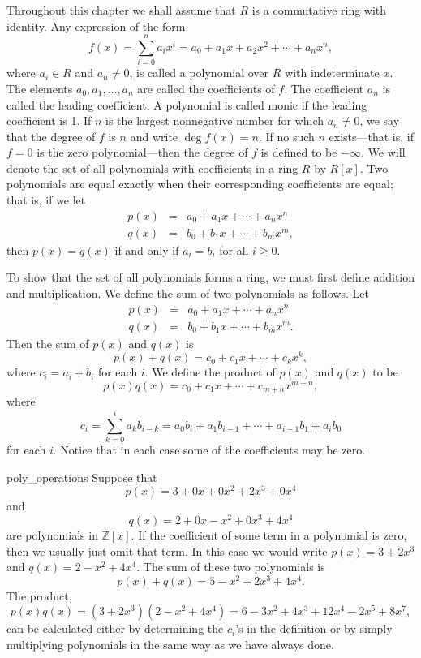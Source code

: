 Throughout this chapter we shall assume that $R$ is a commutative ring with identity.  Any expression of the form 
$$
f(x) = \sum^{n}_{i=0} a_i x^i = a_0 + a_1 x +a_2 x^2 + \cdots + a_n x^n, 
$$
where $a_i \in R$ and $a_n \neq 0$, is called a {\bfi polynomial over $R$} with {\bfi indeterminate} $x$.  The elements $a_0, a_1, \ldots, a_n$ are called the {\bfi coefficients\/} of $f$.  The coefficient $a_n$ is called the {\bfi leading coefficient}.  A polynomial is called {\bfi monic\/} if the leading coefficient is 1.  If $n$ is the largest nonnegative number for which $a_n \neq 0$, we say that the {\bfi degree\/} of $f$ is $n$ and write $\deg f(x) = n$\label{polydegree}.  If no such $n$ exists---that is, if $f=0$ is the zero polynomial---then the degree of $f$ is defined to be $-\infty$.  We will denote the set of all polynomials with coefficients in a ring $R$ by $R[x]$\label{polynomialring}.  Two polynomials are equal exactly when their corresponding coefficients are equal; that is, if we let    
\begin{eqnarray*}
p(x) & = & a_0 + a_1 x + \cdots + a_n x^n \\
q(x) & = & b_0 + b_1 x + \cdots + b_m x^m,
\end{eqnarray*}
then $p(x) = q(x)$ if and only if $a_i = b_i$ for all $i \geq 0$.

To show that the set of all polynomials forms a ring, we must first define addition and multiplication.  We define the sum of two polynomials as follows.  Let
\begin{eqnarray*}
p(x) & = & a_0 + a_1 x + \cdots + a_n x^n \\
q(x) & = & b_0 + b_1 x + \cdots + b_m x^m.
\end{eqnarray*}
Then the sum of $p(x)$ and $q(x)$ is
$$
p(x) + q(x) = c_0 + c_1 x + \cdots + c_k x^k,
$$
where $c_i = a_i + b_i$ for each $i$.  We define the product of $p(x)$ and $q(x)$ to be 
$$
p(x) q(x) = c_0 + c_1 x + \cdots + c_{m + n} x^{m + n},
$$
where
$$
c_i = \sum_{k = 0}^i a_k b_{i - k} = a_0  b_i + a_1 b_{i -1} + \cdots + a_{i -1} b _1 + a_i b_0
$$
for each $i$.  Notice that in each case some of the coefficients may be zero. 

\begin{example}{poly_operations}
Suppose that
$$
p(x) = 3 + 0 x + 0 x^2 + 2 x^3 + 0 x^4
$$
and
$$
q(x) = 2 + 0 x - x^2 + 0 x^3 + 4 x^4
$$
are polynomials in ${\mathbb Z}[x]$.  If the coefficient of some term in a polynomial is zero, then we usually just omit that term.  In this case we  would write $p(x) =  3 + 2 x^3$ and $q(x) = 2 - x^2 + 4 x^4$.  The sum of these two polynomials is
$$
p(x) + q(x)= 5 - x^2 + 2 x^3 + 4 x^4.
$$
The product,
$$
p(x) q(x) = (3 + 2 x^3)( 2 - x^2 + 4 x^4 ) =  6 - 3x^2 + 4 x^3 + 12 x^4  - 2 x^5 + 8 x^7,
$$
can be calculated either by determining the $c_i$'s in the definition or by simply multiplying polynomials in the same way as we have
always done.
\end{example}


